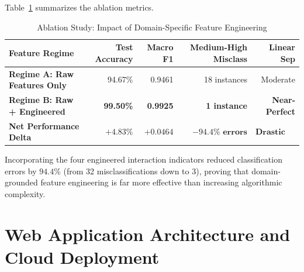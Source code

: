 \documentclass[12pt,a4paper,oneside]{report}
\begin{document}
Table~\ref{tab:ablation_results} summarizes the ablation metrics.

\begin{table}[H]
\centering
\caption{Ablation Study: Impact of Domain-Specific Feature Engineering}
\label{tab:ablation_results}
\small
\begin{tabularx}{0.9\textwidth}{Xrrrr}
\toprule
\textbf{Feature Regime} & \textbf{Test Accuracy} & \textbf{Macro F1} & \textbf{Medium-High Misclass} & \textbf{Linear Sep} \\
\midrule
\textbf{Regime A: Raw Features Only} & 94.67\% & 0.9461 & 18 instances & Moderate \\
\textbf{Regime B: Raw + Engineered} & \textbf{99.50\%} & \textbf{0.9925} & \textbf{1 instance} & \textbf{Near-Perfect} \\
\midrule
\textbf{Net Performance Delta} & $\mathbf{+4.83\%}$ & $\mathbf{+0.0464}$ & $\mathbf{-94.4\% \text{ errors}}$ & $\mathbf{\text{Drastic boost}}$ \\
\bottomrule
\end{tabularx}
\end{table}

Incorporating the four engineered interaction indicators reduced classification errors by $94.4\%$ (from 32 misclassifications down to 3), proving that domain-grounded feature engineering is far more effective than increasing algorithmic complexity.


\chapter{Web Application Architecture and Cloud Deployment}
\label{ch:web_app}
\end{document}
